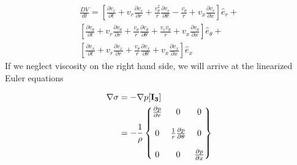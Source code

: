 \begin{align*}
\frac{DV}{dt} =
\left[ 
\frac{\partial v_r}{\partial t} + 
v_r \frac{\partial v_r}{\partial r}  +
\frac{v_{\theta}^2}{r}\frac{\partial v_r}{\partial \theta } -
\frac{v_{\theta}}{r} + v_x \frac{\partial v_r}{\partial x} 
\right] \hat{e}_r +\\
\left[ 
\frac{\partial v_\theta}{\partial t} + 
v_r \frac{\partial v_\theta}{\partial r}  +
\frac{v_{\theta}}{r}\frac{\partial v_{\theta}}{\partial \theta } +
\frac{v_r v_\theta}{r} +
v_x \frac{\partial v_{\theta}}{\partial x} 
\right] \hat{e}_{\theta} +\\
\left[ 
\frac{\partial v_x}{\partial t} + 
v_r \frac{\partial v_x}{\partial r}  +
\frac{v_{\theta}}{r}\frac{\partial v_x}{\partial \theta } + v_x \frac{\partial v_x}{\partial x} 
\right] \hat{e}_x
\end{align*}
If we neglect viscosity on the right hand side, we will arrive at the linearized Euler equations

\begin{align*}
\nabla \sigma &= -\nabla p [\bf{I_3}]\\
&=-\frac{1}{\rho}\begin{Bmatrix*}
\frac{\partial p}{\partial r} & 0 & 0\\
\\
0 & \frac{1}{r}\frac{\partial p}{\partial \theta} & 0\\
\\
0 & 0 &	\frac{\partial p}{\partial x} \\
\end{Bmatrix*}	
\end{align*}
